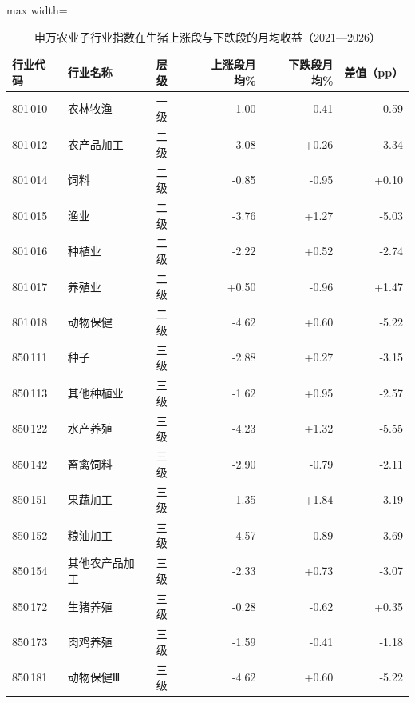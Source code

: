\begin{table}[htbp]
\centering
\scriptsize
\caption{申万农业子行业指数在生猪上涨段与下跌段的月均收益（2021—2026）}
\label{tab:phase-sw}
\begin{adjustbox}{max width=\textwidth}
\begin{tabular}{@{}lllrrr@{}}
\toprule
行业代码 & 行业名称 & 层级 & 上涨段月均\% & 下跌段月均\% & 差值（pp） \\
\midrule
801\,010 & 农林牧渔 & 一级 & -1.00 & -0.41 & -0.59 \\
801\,012 & 农产品加工 & 二级 & -3.08 & +0.26 & -3.34 \\
801\,014 & 饲料 & 二级 & -0.85 & -0.95 & +0.10 \\
801\,015 & 渔业 & 二级 & -3.76 & +1.27 & -5.03 \\
801\,016 & 种植业 & 二级 & -2.22 & +0.52 & -2.74 \\
801\,017 & 养殖业 & 二级 & +0.50 & -0.96 & +1.47 \\
801\,018 & 动物保健 & 二级 & -4.62 & +0.60 & -5.22 \\
850\,111 & 种子 & 三级 & -2.88 & +0.27 & -3.15 \\
850\,113 & 其他种植业 & 三级 & -1.62 & +0.95 & -2.57 \\
850\,122 & 水产养殖 & 三级 & -4.23 & +1.32 & -5.55 \\
850\,142 & 畜禽饲料 & 三级 & -2.90 & -0.79 & -2.11 \\
850\,151 & 果蔬加工 & 三级 & -1.35 & +1.84 & -3.19 \\
850\,152 & 粮油加工 & 三级 & -4.57 & -0.89 & -3.69 \\
850\,154 & 其他农产品加工 & 三级 & -2.33 & +0.73 & -3.07 \\
850\,172 & 生猪养殖 & 三级 & -0.28 & -0.62 & +0.35 \\
850\,173 & 肉鸡养殖 & 三级 & -1.59 & -0.41 & -1.18 \\
850\,181 & 动物保健Ⅲ & 三级 & -4.62 & +0.60 & -5.22 \\
\bottomrule
\end{tabular}
\end{adjustbox}
\end{table}
